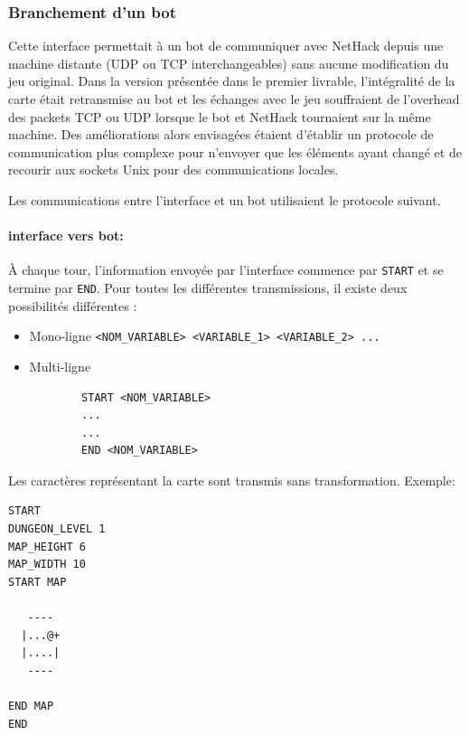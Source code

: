 \documentclass[a4paper,11pt]{article}
\begin{document}
\subsubsection*{Branchement d'un bot}

Cette interface permettait à un bot de communiquer avec NetHack depuis une machine distante (UDP ou TCP interchangeables) sans aucune modification du jeu original. Dans la version présentée dans le premier livrable, l'intégralité de la carte était retransmise au bot et les échanges avec le jeu souffraient de l'overhead des packets TCP ou UDP lorsque le bot et NetHack tournaient sur la même machine. Des améliorations alors envisagées étaient d'établir un protocole de communication plus complexe pour n'envoyer que les éléments ayant changé et de recourir aux sockets Unix pour des communications locales.

Les communications entre l'interface et un bot utilisaient le protocole suivant.

\paragraph{interface vers bot:} À chaque tour, l'information envoyée par l'interface commence par \verb!START! et se termine par \verb!END!. Pour toutes les différentes transmissions, il existe deux possibilités différentes :
\begin{itemize}
	\item Mono-ligne \verb!<NOM_VARIABLE> <VARIABLE_1> <VARIABLE_2> ...!
	\item Multi-ligne
		\begin{verbatim}
		START <NOM_VARIABLE>
		...
		...
		END <NOM_VARIABLE>
		\end{verbatim}
\end{itemize}
Les caractères représentant la carte sont transmis sans transformation. Exemple:
\begin{verbatim}
START
DUNGEON_LEVEL 1
MAP_HEIGHT 6
MAP_WIDTH 10
START MAP
          
   ----   
  |...@+  
  |....|  
   ----   
          
END MAP
END
\end{verbatim}
\end{document}
